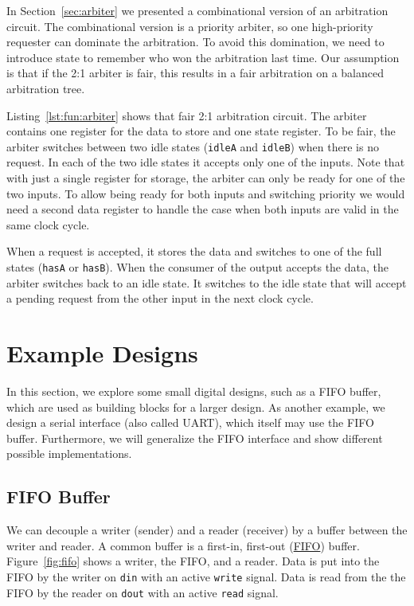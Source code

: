 \documentclass[%
    10pt,
    headinclude, footexclude,
    openright, %
    notitlepage,
    cleardoubleempty,
    headsepline,
    pointlessnumbers,
    bibtotoc, idxtotoc,
    ]{scrbook}
\newcommand{\code}[1]{{\small{\texttt{#1}}}}
\begin{document}
In Section~\ref{sec:arbiter} we presented a combinational version of an arbitration circuit.
The combinational version is a priority arbiter, so one high-priority requester can
dominate the arbitration.
To avoid this domination, we need to introduce state to remember who won the arbitration last time.
Our assumption is that if the 2:1 arbiter is fair, this results in a fair
arbitration on a balanced arbitration tree.


Listing~\ref{lst:fun:arbiter} shows that fair 2:1 arbitration circuit.
The arbiter contains one register for the data to store and one state register. To be fair, the arbiter
switches between two idle states (\code{idleA} and \code{idleB}) when there is no request.
In each of the two idle states it accepts only one of the inputs. Note that with just a single register for
storage, the arbiter can only be ready for one of the two inputs. To allow being ready for both inputs
and switching priority we would need a second data register to handle the case when both inputs
are valid in the same clock cycle.

When a request is accepted, it stores the data and switches to one of the full states (\code{hasA}
or \code{hasB}).
When the consumer of the output accepts the data, the arbiter switches back to an idle state.
It switches to the idle state that will accept a pending request from the other input
in the next clock cycle.



\chapter{Example Designs}

In this section, we explore some small digital designs, such as
a FIFO buffer, which are used as building blocks for a larger design.
As another example, we design a serial interface (also called UART),
which itself may use the FIFO buffer. Furthermore, we will generalize
the FIFO interface and show different possible implementations.

\section{FIFO Buffer}
\label{sec:fifo}



We can decouple a writer (sender) and a reader (receiver) by a buffer
between the writer and reader.
A common buffer is a first-in, first-out
(\href{https://en.wikipedia.org/wiki/FIFO_%28computing_and_electronics%29}{FIFO})
buffer. Figure~\ref{fig:fifo} shows a writer, the FIFO, and a reader.
Data is put into the FIFO by the writer on \code{din} with an active
\code{write} signal. Data is read from the the FIFO by the reader on
\code{dout} with an active \code{read} signal.
\end{document}
